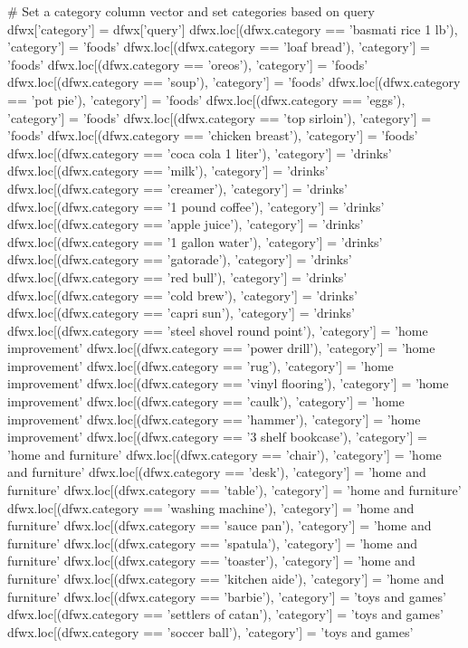 \begin{python}
# Set a category column vector and set categories based on query
dfwx['category'] = dfwx['query']
dfwx.loc[(dfwx.category == 'basmati rice 1 lb'), 'category'] = 'foods'
dfwx.loc[(dfwx.category == 'loaf bread'), 'category'] = 'foods'
dfwx.loc[(dfwx.category == 'oreos'), 'category'] = 'foods'
dfwx.loc[(dfwx.category == 'soup'), 'category'] = 'foods'
dfwx.loc[(dfwx.category == 'pot pie'), 'category'] = 'foods'
dfwx.loc[(dfwx.category == 'eggs'), 'category'] = 'foods'
dfwx.loc[(dfwx.category == 'top sirloin'), 'category'] = 'foods'
dfwx.loc[(dfwx.category == 'chicken breast'), 'category'] = 'foods'
dfwx.loc[(dfwx.category == 'coca cola 1 liter'), 'category'] = 'drinks'
dfwx.loc[(dfwx.category == 'milk'), 'category'] = 'drinks'
dfwx.loc[(dfwx.category == 'creamer'), 'category'] = 'drinks'
dfwx.loc[(dfwx.category == '1 pound coffee'), 'category'] = 'drinks'
dfwx.loc[(dfwx.category == 'apple juice'), 'category'] = 'drinks'
dfwx.loc[(dfwx.category == '1 gallon water'), 'category'] = 'drinks'
dfwx.loc[(dfwx.category == 'gatorade'), 'category'] = 'drinks'
dfwx.loc[(dfwx.category == 'red bull'), 'category'] = 'drinks'
dfwx.loc[(dfwx.category == 'cold brew'), 'category'] = 'drinks'
dfwx.loc[(dfwx.category == 'capri sun'), 'category'] = 'drinks'
dfwx.loc[(dfwx.category == 'steel shovel round point'), 'category'] = 'home improvement'
dfwx.loc[(dfwx.category == 'power drill'), 'category'] = 'home improvement'
dfwx.loc[(dfwx.category == 'rug'), 'category'] = 'home improvement'
dfwx.loc[(dfwx.category == 'vinyl flooring'), 'category'] = 'home improvement'
dfwx.loc[(dfwx.category == 'caulk'), 'category'] = 'home improvement'
dfwx.loc[(dfwx.category == 'hammer'), 'category'] = 'home improvement'
dfwx.loc[(dfwx.category == '3 shelf bookcase'), 'category'] = 'home and furniture'
dfwx.loc[(dfwx.category == 'chair'), 'category'] = 'home and furniture'
dfwx.loc[(dfwx.category == 'desk'), 'category'] = 'home and furniture'
dfwx.loc[(dfwx.category == 'table'), 'category'] = 'home and furniture'
dfwx.loc[(dfwx.category == 'washing machine'), 'category'] = 'home and furniture'
dfwx.loc[(dfwx.category == 'sauce pan'), 'category'] = 'home and furniture'
dfwx.loc[(dfwx.category == 'spatula'), 'category'] = 'home and furniture'
dfwx.loc[(dfwx.category == 'toaster'), 'category'] = 'home and furniture'
dfwx.loc[(dfwx.category == 'kitchen aide'), 'category'] = 'home and furniture'
dfwx.loc[(dfwx.category == 'barbie'), 'category'] = 'toys and games'
dfwx.loc[(dfwx.category == 'settlers of catan'), 'category'] = 'toys and games'
dfwx.loc[(dfwx.category == 'soccer ball'), 'category'] = 'toys and games'

\end{python}
